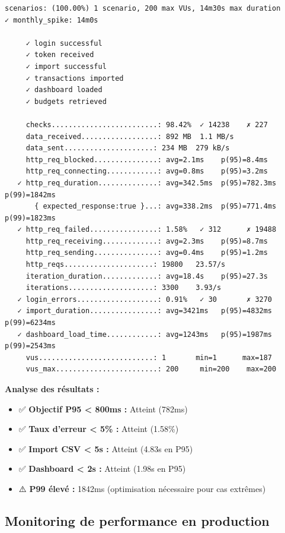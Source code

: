 \begin{tcolorbox}[colback=yellow!5!white,colframe=yellow!60!black,title=\textbf{Rapport de performance k6 - Simulation pic mensuel (1er janvier 2025)}]
\begin{verbatim}
scenarios: (100.00%) 1 scenario, 200 max VUs, 14m30s max duration
✓ monthly_spike: 14m0s

     ✓ login successful
     ✓ token received
     ✓ import successful
     ✓ transactions imported
     ✓ dashboard loaded
     ✓ budgets retrieved

     checks.........................: 98.42%  ✓ 14238    ✗ 227
     data_received..................: 892 MB  1.1 MB/s
     data_sent.....................: 234 MB  279 kB/s
     http_req_blocked...............: avg=2.1ms    p(95)=8.4ms
     http_req_connecting............: avg=0.8ms    p(95)=3.2ms
   ✓ http_req_duration..............: avg=342.5ms  p(95)=782.3ms  p(99)=1842ms
       { expected_response:true }...: avg=338.2ms  p(95)=771.4ms  p(99)=1823ms
   ✓ http_req_failed................: 1.58%   ✓ 312      ✗ 19488
     http_req_receiving.............: avg=2.3ms    p(95)=8.7ms
     http_req_sending...............: avg=0.4ms    p(95)=1.2ms
     http_reqs.....................: 19800   23.57/s
     iteration_duration.............: avg=18.4s    p(95)=27.3s
     iterations....................: 3300    3.93/s
   ✓ login_errors...................: 0.91%   ✓ 30       ✗ 3270
   ✓ import_duration................: avg=3421ms   p(95)=4832ms   p(99)=6234ms
   ✓ dashboard_load_time............: avg=1243ms   p(95)=1987ms   p(99)=2543ms
     vus...........................: 1       min=1      max=187
     vus_max........................: 200     min=200    max=200
\end{verbatim}

\textbf{Analyse des résultats :}
\begin{itemize}
    \item ✅ \textbf{Objectif P95 < 800ms :} Atteint (782ms)
    \item ✅ \textbf{Taux d'erreur < 5\% :} Atteint (1.58\%)
    \item ✅ \textbf{Import CSV < 5s :} Atteint (4.83s en P95)
    \item ✅ \textbf{Dashboard < 2s :} Atteint (1.98s en P95)
    \item ⚠️ \textbf{P99 élevé :} 1842ms (optimisation nécessaire pour cas extrêmes)
\end{itemize}
\end{tcolorbox}

\subsection{Monitoring de performance en production}

